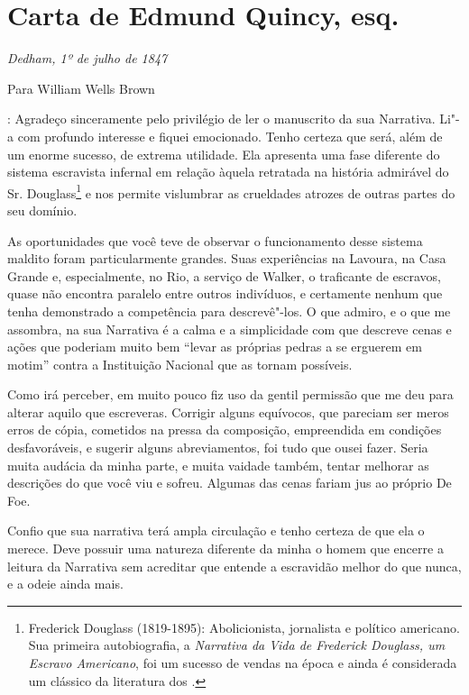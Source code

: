 \chapter{Carta de Edmund Quincy, esq.}

\begin{flushright}
\emph{Dedham, 1º de julho de 1847}
\end{flushright}

\begin{flushleft}
Para William Wells Brown
\end{flushleft}

: Agradeço sinceramente pelo privilégio de ler o
manuscrito da sua Narrativa. Li"-a com profundo interesse e fiquei
emocionado. Tenho certeza que será, além de um enorme sucesso, de
extrema utilidade. Ela apresenta uma fase diferente do sistema
escravista infernal em relação àquela retratada na história admirável do
Sr. Douglass\footnote{Frederick Douglass (1819-1895): Abolicionista,
  jornalista e político americano. Sua primeira autobiografia, a
  \emph{Narrativa da Vida de Frederick Douglass, um Escravo Americano},
  foi um sucesso de vendas na época e ainda é considerada um clássico da
  literatura dos .} e nos permite vislumbrar as crueldades atrozes de
outras partes do seu domínio.

As oportunidades que você teve de observar o funcionamento desse sistema
maldito foram particularmente grandes. Suas experiências na Lavoura, na
Casa Grande e, especialmente, no Rio, a serviço de Walker, o traficante
de escravos, quase não encontra paralelo entre outros indivíduos, e
certamente nenhum que tenha demonstrado a competência para descrevê"-los.
O que admiro, e o que me assombra, na sua Narrativa é a calma e a
simplicidade com que descreve cenas e ações que poderiam muito bem
``levar as próprias pedras a se erguerem em motim'' contra a Instituição
Nacional que as tornam possíveis.

Como irá perceber, em muito pouco fiz uso da gentil permissão que me deu
para alterar aquilo que escreveras. Corrigir alguns equívocos, que
pareciam ser meros erros de cópia, cometidos na pressa da composição,
empreendida em condições desfavoráveis, e sugerir alguns abreviamentos,
foi tudo que ousei fazer. Seria muita audácia da minha parte, e muita
vaidade também, tentar melhorar as descrições do que você viu e sofreu.
Algumas das cenas fariam jus ao próprio De Foe.

Confio que sua narrativa terá ampla circulação e tenho certeza de que
ela o merece. Deve possuir uma natureza diferente da minha o homem que
encerre a leitura da Narrativa sem acreditar que entende a escravidão
melhor do que nunca, e a odeie ainda mais.

